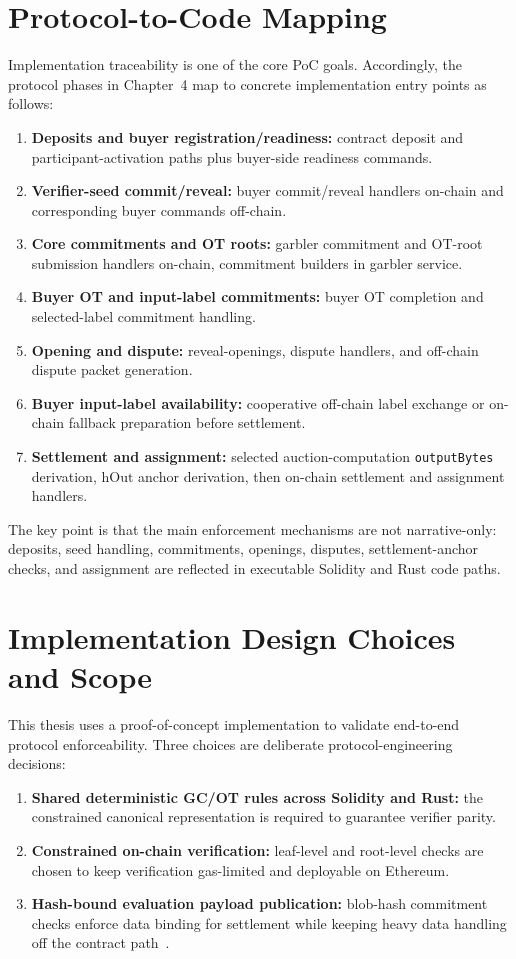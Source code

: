 \documentclass[final,twoside]{vutinfth}
\begin{document}
\section{Protocol-to-Code Mapping}
Implementation traceability is one of the core PoC goals.
Accordingly, the protocol phases in Chapter~4 map to concrete implementation entry points as follows:
\begin{enumerate}
\item \textbf{Deposits and buyer registration/readiness:} contract deposit and participant-activation paths plus buyer-side readiness commands.
\item \textbf{Verifier-seed commit/reveal:} buyer commit/reveal handlers on-chain and corresponding buyer commands off-chain.
\item \textbf{Core commitments and OT roots:} garbler commitment and OT-root submission handlers on-chain, commitment builders in garbler service.
\item \textbf{Buyer OT and input-label commitments:} buyer OT completion and selected-label commitment handling.
\item \textbf{Opening and dispute:} reveal-openings, dispute handlers, and off-chain dispute packet generation.
\item \textbf{Buyer input-label availability:} cooperative off-chain label exchange or on-chain fallback preparation before settlement.
\item \textbf{Settlement and assignment:} selected auction-computation \texttt{outputBytes} derivation, $\mathrm{hOut}$ anchor derivation, then on-chain settlement and assignment handlers.
\end{enumerate}

The key point is that the main enforcement mechanisms are not narrative-only: deposits, seed handling, commitments, openings, disputes, settlement-anchor checks, and assignment are reflected in executable Solidity and Rust code paths.

\section{Implementation Design Choices and Scope}
This thesis uses a proof-of-concept implementation to validate end-to-end
protocol enforceability.
Three choices are deliberate protocol-engineering decisions:
\begin{enumerate}
\item \textbf{Shared deterministic GC/OT rules across Solidity and Rust:} the constrained canonical representation is required to guarantee verifier parity.
\item \textbf{Constrained on-chain verification:} leaf-level and root-level checks are chosen to keep verification gas-limited and deployable on Ethereum.
\item \textbf{Hash-bound evaluation payload publication:} blob-hash commitment checks enforce data binding for settlement while keeping heavy data handling off the contract path~\cite{Buterin2022EIP4844}.
\end{enumerate}
\end{document}
